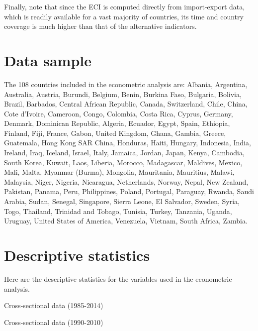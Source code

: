 \documentclass[abstract=on]{scrartcl}
\begin{document}
Finally, note that since the ECI is computed directly from import-export data, which is readily available for a vast majority of countries, its time and country coverage is much higher than that of the alternative indicators.

\section{Data sample}

The 108 countries included in the econometric analysis are: Albania, Argentina, Australia, Austria, Burundi, Belgium, Benin, Burkina Faso, Bulgaria, Bolivia, Brazil, Barbados, Central African Republic, Canada, Switzerland, Chile, China, Cote d’Ivoire, Cameroon, Congo, Colombia, Costa Rica, Cyprus, Germany, Denmark, Dominican Republic, Algeria, Ecuador, Egypt, Spain, Ethiopia, Finland, Fiji, France, Gabon, United Kingdom, Ghana, Gambia, Greece, Guatemala, Hong Kong SAR China, Honduras, Haiti, Hungary, Indonesia, India, Ireland, Iraq, Iceland, Israel, Italy, Jamaica, Jordan, Japan, Kenya, Cambodia, South Korea, Kuwait, Laos, Liberia, Morocco, Madagascar, Maldives, Mexico, Mali, Malta, Myanmar (Burma), Mongolia, Mauritania, Mauritius, Malawi, Malaysia, Niger, Nigeria, Nicaragua, Netherlands, Norway, Nepal, New Zealand, Pakistan, Panama, Peru, Philippines, Poland, Portugal, Paraguay, Rwanda, Saudi Arabia, Sudan, Senegal, Singapore, Sierra Leone, El Salvador, Sweden, Syria, Togo, Thailand, Trinidad and Tobago, Tunisia, Turkey, Tanzania, Uganda, Uruguay, United States of America, Venezuela, Vietnam, South Africa, Zambia.

\section{Descriptive statistics}

Here are the descriptive statistics for the variables used in the econometric analysis.

\begin{table}[!htbp] \centering 
  \caption{Cross-sectional data (1985-2014)} 
  \label{} 

\end{table} 

\begin{table}[!htbp] \centering 
  \caption{Cross-sectional data (1990-2010)} 
  \label{} 

\end{table} 
\end{document}

